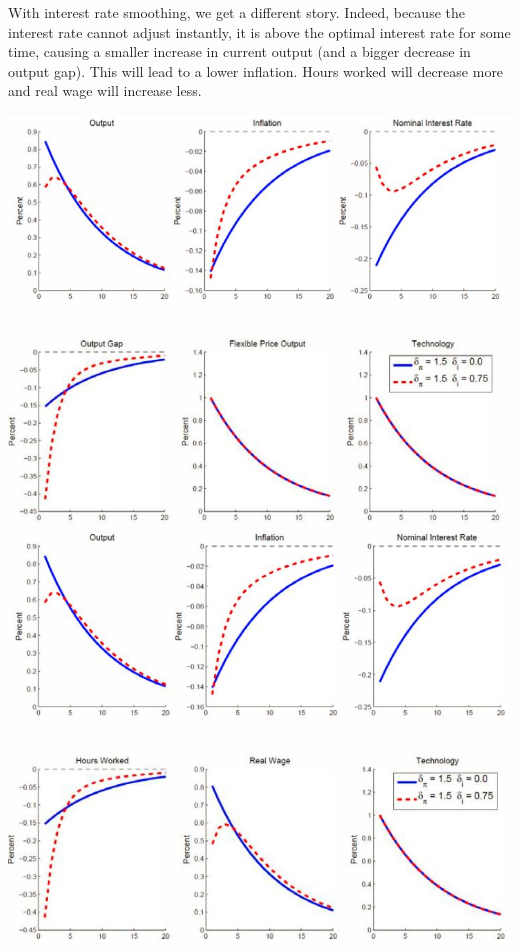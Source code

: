 \documentclass[12pt]{report}
\begin{document}
With interest rate smoothing, we get a different story. Indeed, because the interest rate cannot adjust instantly, it is above the optimal interest rate for some time, causing a smaller increase in current output (and a bigger decrease in output gap). This will lead to a lower inflation. Hours worked will decrease more and real wage will increase less.\begin{center}
\includegraphics[scale=0.5]{images/techshock3DNK1i}
\includegraphics[scale=0.5]{images/techshock3DNK2i}
\end{center}
\end{document}
